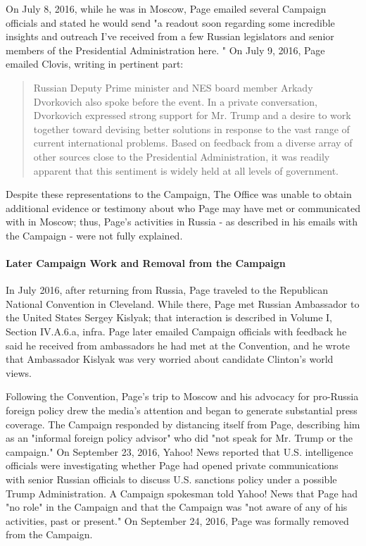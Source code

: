 On July 8, 2016, while he was in Moscow, Page emailed several Campaign officials and stated he would send "a readout soon regarding some incredible insights and outreach I've received from a few Russian legislators and senior members of the Presidential Administration here. "%
On July 9, 2016, Page emailed Clovis, writing in pertinent part:

\begin{quote}
Russian Deputy Prime minister and NES board member Arkady Dvorkovich also spoke before the event.
In a private conversation, Dvorkovich expressed strong support for Mr. Trump and a desire to work together toward devising better solutions in response to the vast range of current international problems.
Based on feedback from a diverse array of other sources close to the Presidential Administration, it was readily apparent that this sentiment is widely held at all levels of government.%
\end{quote}

Despite these representations to the Campaign,
The Office was unable to obtain additional evidence or testimony about who Page may have met or communicated with in Moscow; thus, Page's activities in Russia - as described in his emails with the Campaign - were not fully explained.

\paragraph{Later Campaign Work and Removal from the Campaign}

In July 2016, after returning from Russia, Page traveled to the Republican National Convention in Cleveland.%
While there, Page met Russian Ambassador to the United States Sergey Kislyak; that interaction is described in Volume I, Section IV.A.6.a, infra.%
Page later emailed Campaign officials with feedback he said he received from ambassadors he had met at the Convention, and he wrote that Ambassador Kislyak was very worried about candidate Clinton's world views.%

Following the Convention, Page's trip to Moscow and his advocacy for pro-Russia foreign policy drew the media's attention and began to generate substantial press coverage.
The Campaign responded by distancing itself from Page, describing him as an "informal foreign policy advisor" who did "not speak for Mr. Trump or the campaign."%
On September 23, 2016, Yahoo! News reported that U.S. intelligence officials were investigating whether Page had opened private communications with senior Russian officials to discuss U.S. sanctions policy under a possible Trump Administration.%
A Campaign spokesman told Yahoo! News that Page had "no role" in the Campaign and that the Campaign was "not aware of any of his activities, past or present."%
On September 24, 2016, Page was formally removed from the Campaign.%

